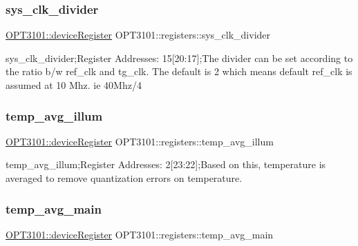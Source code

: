 \subsubsection{\texorpdfstring{sys\+\_\+clk\+\_\+divider}{sys\_clk\_divider}}
{\footnotesize\ttfamily \mbox{\hyperlink{class_o_p_t3101_1_1device_register}{O\+P\+T3101\+::device\+Register}} O\+P\+T3101\+::registers\+::sys\+\_\+clk\+\_\+divider}



sys\+\_\+clk\+\_\+divider;Register Addresses\+: 15\mbox{[}20\+:17\mbox{]};The divider can be set according to the ratio b/w ref\+\_\+clk and tg\+\_\+clk. The default is 2 which means default ref\+\_\+clk is assumed at 10 Mhz. ie 40\+Mhz/4 

\mbox{\label{class_o_p_t3101_1_1registers_af8a6681cc72c45378bd2d170f593e362}} 
\subsubsection{\texorpdfstring{temp\+\_\+avg\+\_\+illum}{temp\_avg\_illum}}
{\footnotesize\ttfamily \mbox{\hyperlink{class_o_p_t3101_1_1device_register}{O\+P\+T3101\+::device\+Register}} O\+P\+T3101\+::registers\+::temp\+\_\+avg\+\_\+illum}



temp\+\_\+avg\+\_\+illum;Register Addresses\+: 2\mbox{[}23\+:22\mbox{]};Based on this, temperature is averaged to remove quantization errors on temperature. 

\mbox{\label{class_o_p_t3101_1_1registers_a111dc31dd6ec741a97786e5207b7bc7b}} 
\subsubsection{\texorpdfstring{temp\+\_\+avg\+\_\+main}{temp\_avg\_main}}
{\footnotesize\ttfamily \mbox{\hyperlink{class_o_p_t3101_1_1device_register}{O\+P\+T3101\+::device\+Register}} O\+P\+T3101\+::registers\+::temp\+\_\+avg\+\_\+main}



